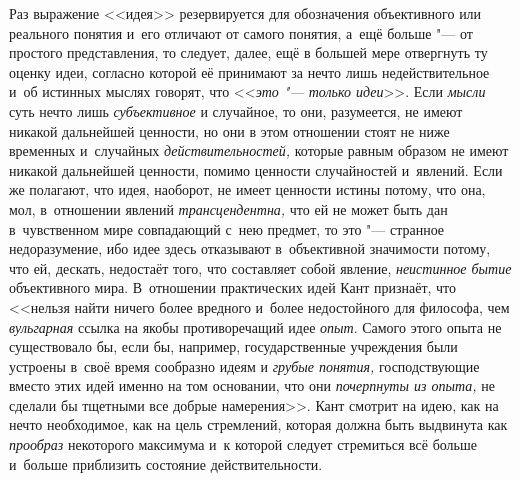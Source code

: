 Раз выражение <<идея>> резервируется для обозначения
объективного или реального понятия и~его отличают от самого понятия, а~ещё
больше "--- от простого представления, то следует, далее, ещё в
большей мере отвергнуть ту оценку идеи, согласно которой её принимают за
нечто лишь недействительное и~об истинных мыслях говорят, что
<<{\em это "--- только
идеи}>>. Если {\em мысли}
суть нечто лишь
{\em субъективное} и
случайное, то они, разумеется, не имеют никакой дальнейшей ценности, но они
в этом отношении стоят не ниже временных и~случайных
{\em действительностей,}
которые равным образом не имеют никакой дальнейшей ценности,
помимо ценности случайностей и~явлений. Если же полагают, что идея,
наоборот, не имеет ценности истины потому, что она, мол, в~отношении
явлений {\em трансцендентна,}
что ей не может быть дан в~чувственном мире совпадающий с~нею
предмет,
то это "--- странное недоразумение, ибо идее
здесь отказывают в~объективной значимости потому, что ей, дескать,
недостаёт того, что составляет собой явление,
{\em неистинное бытие}
объективного мира. В~отношении практических идей Кант
признаёт, что <<нельзя найти ничего более вредного и~более недостойного для
философа, чем {\em вульгарная}
ссылка на якобы противоречащий идее
{\em опыт}. Самого этого
опыта не существовало бы, если бы, например, государственные учреждения
были устроены в~своё время сообразно идеям и
{\em грубые понятия,} господствующие вместо этих идей именно на том
основании, что они {\em почерпнуты из опыта,} не сделали бы тщетными
все добрые намерения>>.
Кант смотрит на идею, как на нечто необходимое, как на цель
стремлений, которая должна быть выдвинута как
{\em прообраз} некоторого
максимума и~к которой следует стремиться всё больше и~больше приблизить
состояние действительности.


